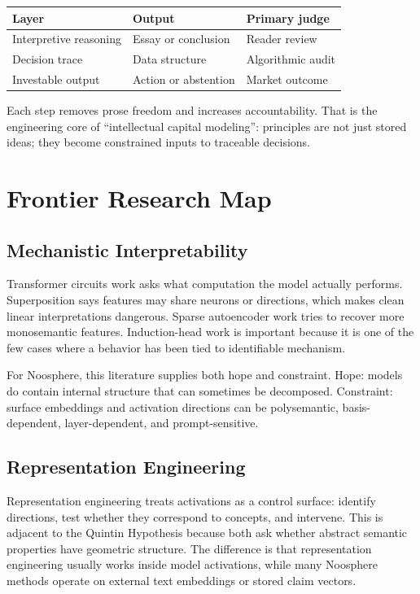 \documentclass[11pt]{article}
\begin{document}
\begin{center}
\begin{tabular}{lll}
\toprule
Layer & Output & Primary judge \\
\midrule
Interpretive reasoning & Essay or conclusion & Reader review \\
Decision trace & Data structure & Algorithmic audit \\
Investable output & Action or abstention & Market outcome \\
\bottomrule
\end{tabular}
\end{center}

Each step removes prose freedom and increases accountability. That is the
engineering core of ``intellectual capital modeling'': principles are not just
stored ideas; they become constrained inputs to traceable decisions.

\section{Frontier Research Map}

\subsection{Mechanistic Interpretability}

Transformer circuits work asks what computation the model actually performs.
Superposition says features may share neurons or directions, which makes clean
linear interpretations dangerous. Sparse autoencoder work tries to recover more
monosemantic features. Induction-head work is important because it is one of the
few cases where a behavior has been tied to identifiable mechanism.

For Noosphere, this literature supplies both hope and constraint. Hope: models
do contain internal structure that can sometimes be decomposed. Constraint:
surface embeddings and activation directions can be polysemantic, basis-
dependent, layer-dependent, and prompt-sensitive.

\subsection{Representation Engineering}

Representation engineering treats activations as a control surface: identify
directions, test whether they correspond to concepts, and intervene. This is
adjacent to the Quintin Hypothesis because both ask whether abstract semantic
properties have geometric structure. The difference is that representation
engineering usually works inside model activations, while many Noosphere
methods operate on external text embeddings or stored claim vectors.
\end{document}
